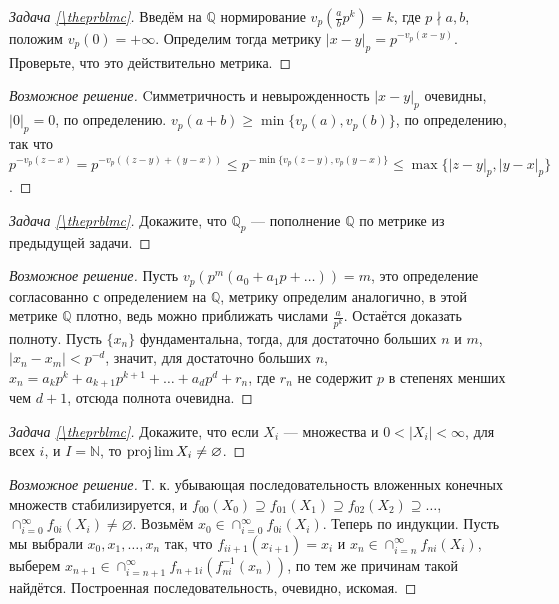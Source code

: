 \documentclass{article}
\theoremstyle{definition}
\theoremstyle{remark}
\newenvironment{solution}
{\begin{proof}[Возможное решение]}
{\end{proof}}
\newcounter{prblmc}
\newenvironment{prblm}
{\renewcommand{\qedsymbol}{}\begin{proof}[Задача \rm{\ref{\theprblmc}}]}
{\stepcounter{prblmc} \end{proof}}
\newcommand{\Q}{\mathbb{Q}}
\begin{document}
\begin{prblm}
	Введём на $\Q$ нормирование $v_p(\frac{a}{b}p^k) = k$, где $p \nmid a, b$, положим $v_p(0) = +\infty$. Определим тогда метрику $|x - y|_p = p^{-v_p(x - y)}$. Проверьте, что это действительно метрика.
\end{prblm}
\begin{solution}
	Cимметричность и невырожденность $|x - y|_p$ очевидны, $|0|_p = 0$, по определению. $v_p(a + b) \ge \min\{v_p(a), v_p(b)\}$, по определению, так что $p^{-v_p(z - x)} = p^{-v_p((z - y) + (y - x))} \le p^{-\min\{v_p(z - y), v_p(y - x)\}} \le \max\{|z - y|_p, |y - x|_p\}$.
\end{solution}

\begin{prblm}
	Докажите, что $\Q_p$ --- пополнение $\Q$ по метрике из предыдущей задачи.
\end{prblm}
\begin{solution}
	Пусть $v_p(p^m(a_0 + a_1 p + \ldots)) = m$, это определение согласованно с определением на $\Q$, метрику определим аналогично, в этой метрике $\Q$ плотно, ведь можно приближать числами $\frac{a}{p^k}$. Остаётся доказать полноту. Пусть $\{x_n\}$ фундаментальна, тогда, для достаточно больших $n$ и $m$, $|x_n - x_m| < p^{-d}$, значит, для достаточно больших $n$, $x_n = a_kp^k + a_{k + 1}p^{k + 1} + \ldots + a_d p^d + r_n$, где $r_n$ не содержит $p$ в степенях менших чем $d + 1$, отсюда полнота очевидна.
\end{solution}

\begin{prblm}
	Докажите, что если $X_i$ --- множества и $0 < |X_i| < \infty$, для всех $i$, и $I = \mathbb{N}$, то $\projlim X_i \neq \varnothing$.
\end{prblm}
\begin{solution}
	Т. к. убывающая последовательность вложенных конечных множеств стабилизируется, и $f_{00}(X_0) \supseteq f_{01}(X_1) \supseteq f_{02}(X_2) \supseteq \ldots$, $\cap_{i = 0}^\infty f_{0i}(X_i) \neq \varnothing$. Возьмём $x_0 \in \cap_{i = 0}^\infty f_{0i}(X_i)$. Теперь по индукции. Пусть мы выбрали $x_0, x_1, \ldots, x_n$ так, что $f_{i i + 1}(x_{i + 1}) = x_i$ и $x_n \in \cap_{i = n}^\infty f_{ni}(X_i)$, выберем $x_{n + 1} \in \cap_{i = n + 1}^\infty f_{n + 1 i}(f_{ni}^{-1}(x_n))$, по тем же причинам такой найдётся. Построенная последовательность, очевидно, искомая.
\end{solution}
\end{document}
